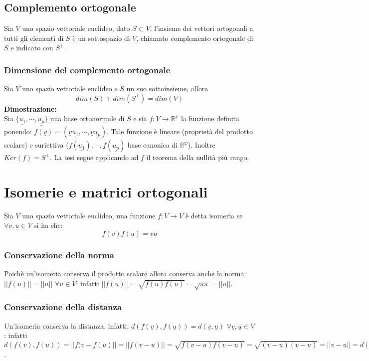 \subsection{Complemento ortogonale}
Sia $V$ uno spazio vettoriale euclideo, dato $S\subset V$, l'insieme dei vettori ortogonali a tutti gli elementi di $S$ \`e un sottospazio di $V$, chiamato complemento ortogonale 
di $S$ e indicato con $S^\bot$.
\subsubsection{Dimensione del complemento ortogonale}
Sia $V$ uno spazio vettoriale euclideo e $S$ un suo sottoinsieme, allora
\begin{equation}
dim(S)+dim(S^\bot)=dim(V)
\end{equation} 
\textbf{Dimostrazione:}\\
Sia $\{\underline{u_1},\cdots,\underline{u_p}\}$ una base ortonormale di $S$ e sia $f:V\rightarrow\mathbb{R^p}$ la funzione definita ponendo: $f(\underline{v})=(\underline{v}
\underline{u_1},\cdots,\underline{v}\underline{u_p})$. Tale funzione \`e lineare (propriet\`a del prodotto scalare) e suriettiva ($f(\underline{u_1}),\cdots,f(\underline{u_p})$ 
base canonica di $\mathbb{R^p}$). Inoltre $Ker(f)=S^\bot$. La tesi segue applicando ad $f$ il teorema della nullit\`a pi\`u rango.
\section{Isomerie e matrici ortogonali}
Sia $V$ uno spazio vettoriale euclideo, una funzione $f:V\rightarrow V$ \`e detta isomeria se $\forall\underline{v},\underline{u}\in V$ si ha che:
\begin{equation}
f(\underline{v})f(\underline{u})=\underline{v}\underline{u}
\end{equation}
\subsubsection{Conservazione della norma}
Poich\`e un'isomeria conserva il prodotto scalare allora conserva anche la norma: $||f(\underline{u})||=||\underline{u}||$ $\forall\underline{u}\in V$: infatti $||
f(\underline{u})||=\sqrt{f(\underline{u})f(\underline{u})}=\sqrt{\underline{u}\underline{u}}=||\underline{u}||$.
\subsubsection{Conservazione della distanza}
Un'isomeria conserva la distanza, infatti: $d(f(\underline{v}),f(\underline{u}))=d(\underline{v},\underline{u})$ $\forall\underline{v},\underline{u}\in V$: infatti 
$d(f(\underline{v}),f(\underline{u}))=||f(\underline{v}-f(\underline{u})||=||f(\underline{v}-\underline{u})||=\sqrt{f(\underline{v}-\underline{u})f(\underline{v}-\underline{u})}
=\sqrt{(\underline{v}-\underline{u})(\underline{v}-\underline{u})}=||\underline{v}-\underline{u}||=d(\underline{v},\underline{u})$.
